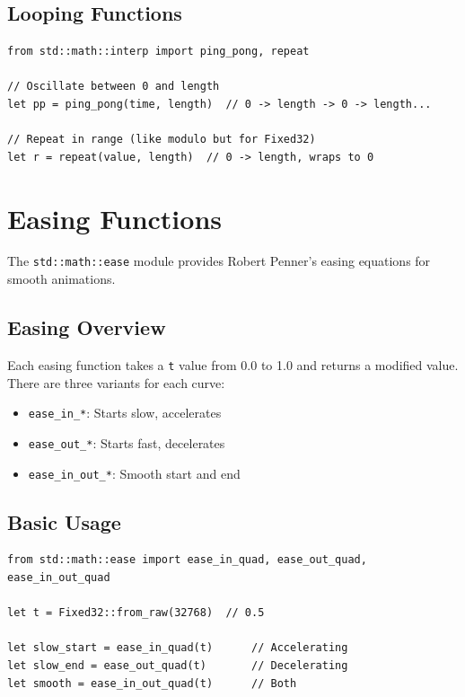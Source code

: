 \subsection{Looping Functions}

\begin{lstlisting}
from std::math::interp import ping_pong, repeat

// Oscillate between 0 and length
let pp = ping_pong(time, length)  // 0 -> length -> 0 -> length...

// Repeat in range (like modulo but for Fixed32)
let r = repeat(value, length)  // 0 -> length, wraps to 0
\end{lstlisting}

\section{Easing Functions}
\label{sec:math-ease}

The \texttt{std::math::ease} module provides Robert Penner's easing equations for smooth animations.

\subsection{Easing Overview}

Each easing function takes a \texttt{t} value from 0.0 to 1.0 and returns a modified value. There are three variants for each curve:
\begin{itemize}
\item \texttt{ease\_in\_*}: Starts slow, accelerates
\item \texttt{ease\_out\_*}: Starts fast, decelerates
\item \texttt{ease\_in\_out\_*}: Smooth start and end
\end{itemize}

\subsection{Basic Usage}

\begin{lstlisting}
from std::math::ease import ease_in_quad, ease_out_quad, ease_in_out_quad

let t = Fixed32::from_raw(32768)  // 0.5

let slow_start = ease_in_quad(t)      // Accelerating
let slow_end = ease_out_quad(t)       // Decelerating
let smooth = ease_in_out_quad(t)      // Both
\end{lstlisting}


